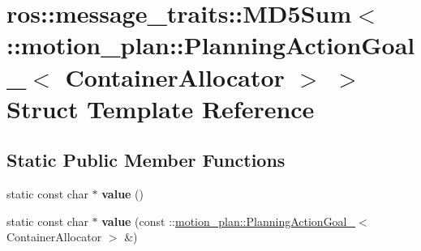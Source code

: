 \hypertarget{structros_1_1message__traits_1_1MD5Sum_3_01_1_1motion__plan_1_1PlanningActionGoal___3_01ContainerAllocator_01_4_01_4}{}\section{ros\+:\+:message\+\_\+traits\+:\+:M\+D5\+Sum$<$ \+:\+:motion\+\_\+plan\+:\+:Planning\+Action\+Goal\+\_\+$<$ Container\+Allocator $>$ $>$ Struct Template Reference}
\label{structros_1_1message__traits_1_1MD5Sum_3_01_1_1motion__plan_1_1PlanningActionGoal___3_01ContainerAllocator_01_4_01_4}
\subsection*{Static Public Member Functions}
\begin{DoxyCompactItemize}
\item 
\mbox{\label{structros_1_1message__traits_1_1MD5Sum_3_01_1_1motion__plan_1_1PlanningActionGoal___3_01ContainerAllocator_01_4_01_4_aab3edac4a698fc5a891376e056386f52}} 
static const char $\ast$ {\bfseries value} ()
\item 
\mbox{\label{structros_1_1message__traits_1_1MD5Sum_3_01_1_1motion__plan_1_1PlanningActionGoal___3_01ContainerAllocator_01_4_01_4_a90bab8f6c21ba6e9030407034ccb5559}} 
static const char $\ast$ {\bfseries value} (const \+::\hyperlink{structmotion__plan_1_1PlanningActionGoal__}{motion\+\_\+plan\+::\+Planning\+Action\+Goal\+\_\+}$<$ Container\+Allocator $>$ \&)
\end{DoxyCompactItemize}
